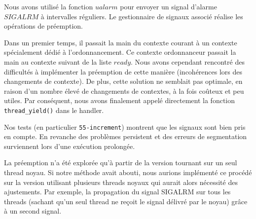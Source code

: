 Nous avons utilisé la fonction $ualarm$ pour envoyer un signal d'alarme $SIGALRM$ à intervalles réguliers. Le gestionnaire de signaux associé réalise les opérations de préemption.

Dans un premier temps, il passait la main du contexte courant à un contexte spécialement dédié à l'ordonnancement. Ce contexte ordonnanceur passait la main au contexte suivant de la liste $ready$.  Nous avons cependant rencontré des difficultés à implémenter la préemption de cette manière (incohérences lors des changements de contexte). De plus, cette solution ne semblait pas optimale, en raison d'un nombre élevé de changements de contextes, à la fois coûteux et peu utiles. Par conséquent, nous avons finalement appelé directement la fonction \verb!thread_yield()! dans le handler. 

Nos tests (en particulier \verb!55-increment!) montrent que les signaux sont bien pris en compte. En revanche des problèmes persistent et des erreurs de segmentation surviennent lors d'une exécution prolongée.

La préemption n'a été explorée qu'à partir de la version tournant sur un seul thread noyau. Si notre méthode avait abouti, nous aurions implémenté ce procédé sur la version utilisant plusieurs threads noyaux qui aurait alors nécessité des ajustements. Par exemple, la propagation du signal SIGALRM sur tous les threads (sachant qu'un seul thread ne reçoit le signal délivré par le noyau) grâce à un second signal.
